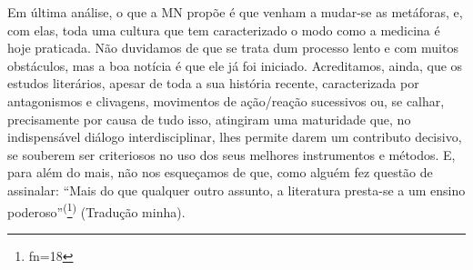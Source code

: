 \documentclass{article}
\makeatletter
\newcommand{\fn}{\afterassignment\fn@aux\count0=}
\newcommand{\fn@aux}{\csname fn\the\count0\endcsname}
\makeatother
\begin{document}
Em última análise, o que a MN propõe é que venham a mudar-se as metáforas, e,
com elas, toda uma cultura que tem caracterizado o modo como a medicina é hoje
praticada. Não duvidamos de que se trata dum processo lento e com muitos
obstáculos, mas a boa notícia é que ele já foi iniciado. Acreditamos, ainda, que
os estudos literários, apesar de toda a sua história recente, caracterizada por
antagonismos e clivagens, movimentos de ação/reação sucessivos ou, se calhar,
precisamente por causa de tudo isso, atingiram uma maturidade que, no
indispensável diálogo interdisciplinar, lhes permite darem um contributo
decisivo, se souberem ser criteriosos no uso dos seus melhores instrumentos e
métodos. E, para além do mais, não nos esqueçamos de que, como alguém fez
questão de assinalar: “Mais do que qualquer outro assunto, a literatura
presta-se a um ensino poderoso”\textsuperscript{(}\footnote{\fn18}\textsuperscript{) }
(Tradução minha).
\end{document}
